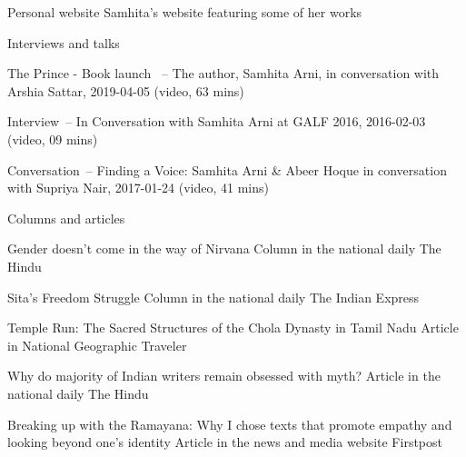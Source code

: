 Personal website Samhita's website featuring some of her works

Interviews and talks

The Prince - Book launch ~-- The author, Samhita Arni, in conversation
with Arshia Sattar, 2019-04-05 (video, 63 mins)

Interview~-- In Conversation with Samhita Arni at GALF 2016, 2016-02-03
(video, 09 mins)

Conversation~-- Finding a Voice: Samhita Arni \& Abeer Hoque in
conversation with Supriya Nair, 2017-01-24 (video, 41 mins)

Columns and articles

Gender doesn't come in the way of Nirvana Column in the national daily
The Hindu

Sita's Freedom Struggle Column in the national daily The Indian Express

Temple Run: The Sacred Structures of the Chola Dynasty in Tamil Nadu
Article in National Geographic Traveler

Why do majority of Indian writers remain obsessed with myth? Article in
the national daily The Hindu

Breaking up with the Ramayana: Why I chose texts that promote empathy
and looking beyond one's identity Article in the news and media website
Firstpost
